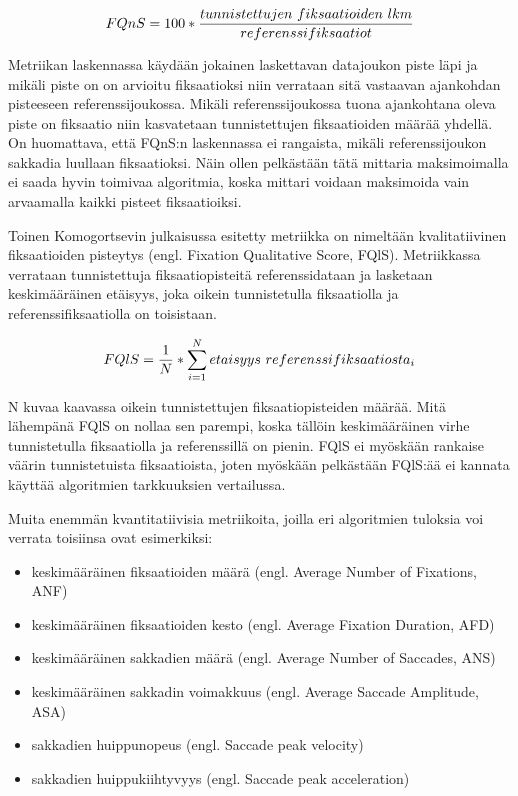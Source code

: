\[
FQnS = 100 * {{tunnistettujen\ fiksaatioiden\ lkm} \over {referenssifiksaatiot}}
\]
 
 Metriikan laskennassa käydään jokainen laskettavan datajoukon piste läpi ja mikäli piste on on arvioitu fiksaatioksi niin verrataan sitä vastaavan ajankohdan pisteeseen referenssijoukossa. Mikäli referenssijoukossa tuona ajankohtana oleva piste on fiksaatio niin kasvatetaan tunnistettujen fiksaatioiden määrää yhdellä. On huomattava, että FQnS:n laskennassa ei rangaista, mikäli referenssijoukon sakkadia luullaan fiksaatioksi. Näin ollen pelkästään tätä mittaria maksimoimalla ei saada hyvin toimivaa algoritmia, koska mittari voidaan maksimoida vain arvaamalla kaikki pisteet fiksaatioiksi.
 
 Toinen Komogortsevin julkaisussa esitetty metriikka on nimeltään kvalitatiivinen fiksaatioiden pisteytys (engl. Fixation Qualitative Score, FQlS). Metriikkassa verrataan tunnistettuja fiksaatiopisteitä referenssidataan ja lasketaan keskimääräinen etäisyys, joka oikein tunnistetulla fiksaatiolla ja referenssifiksaatiolla on toisistaan. 

\[
FQlS = {1 \over N} * \sum\limits_{i=1}^N etaisyys\ referenssifiksaatiosta_i
\]

N kuvaa kaavassa oikein tunnistettujen fiksaatiopisteiden määrää. Mitä lähempänä FQlS on nollaa sen parempi, koska tällöin keskimääräinen virhe tunnistetulla fiksaatiolla ja referenssillä on pienin. FQlS ei myöskään rankaise väärin tunnistetuista fiksaatioista, joten myöskään pelkästään FQlS:ää ei kannata käyttää algoritmien tarkkuuksien vertailussa.

Muita enemmän kvantitatiivisia metriikoita, joilla eri algoritmien tuloksia voi verrata toisiinsa ovat esimerkiksi:
\begin{itemize}
  \item keskimääräinen fiksaatioiden määrä (engl. Average Number of Fixations, ANF) \citep[s. 4]{komogortsev2010}
  \item keskimääräinen fiksaatioiden kesto (engl. Average Fixation Duration, AFD) \citep[s. 4]{komogortsev2010}
  \item keskimääräinen sakkadien määrä (engl. Average Number of Saccades, ANS) \citep[s. 4]{komogortsev2010}
	\item keskimääräinen sakkadin voimakkuus (engl. Average Saccade Amplitude, ASA) \citep[s. 4]{komogortsev2010}
	\item sakkadien huippunopeus (engl. Saccade peak velocity) \citep[s. 195]{nystrom2010}
	\item sakkadien huippukiihtyvyys (engl. Saccade peak acceleration) \citep[s. 195]{nystrom2010}
	
\end{itemize}

